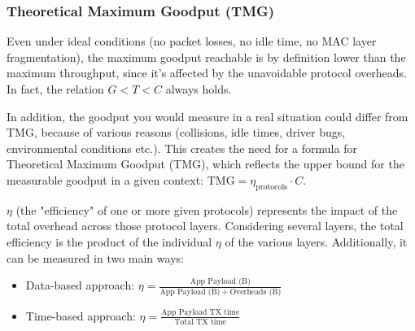     \subsubsection{Theoretical Maximum Goodput (TMG)}
    \label{TMG}
    Even under ideal conditions (no packet losses, no idle time, no MAC layer fragmentation), the maximum goodput reachable is by definition lower than the maximum throughput, since it's affected by the unavoidable protocol overheads. In fact, the relation $G<T<C$ always holds. 
    
    In addition, the goodput you would measure in a real situation could differ from TMG, because of various reasons (collisions, idle times, driver bugs, environmental conditions etc.). This creates the need for a formula for Theoretical Maximum Goodput (TMG), which reflects the upper bound for the measurable goodput in a given context: $\text{TMG}=\eta_{\text{protocols}}\cdot C$.
    
    $\eta$ (the "efficiency" of one or more given protocols) represents the impact of the total overhead across those protocol layers. Considering several layers, the total efficiency is the product of the individual $\eta$ of the various layers. Additionally, it can be measured in two main ways:
    \begin{itemize}
        \item Data-based approach: $\eta=\frac{\text{App Payload (B)}}{\text{App Payload (B)}\ +\ \text{Overheads (B)}}$
        \item Time-based approach: $\eta=\frac{\text{App Payload TX time}}{\text{Total TX time}}$
    \end{itemize}
